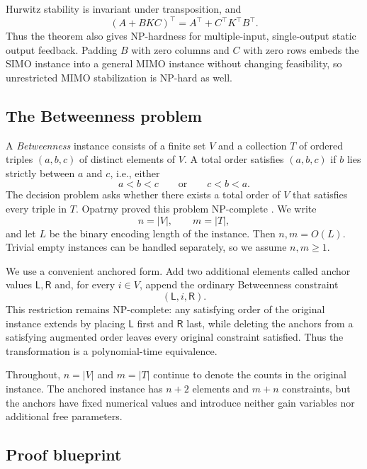 \documentclass[final,5p,times,twocolumn]{elsarticle}
\begin{document}
Hurwitz stability is invariant under transposition, and
\[
(A+BKC)^\top=A^\top+C^\top K^\top B^\top.
\]
Thus the theorem also gives NP-hardness for multiple-input, single-output static output feedback. Padding $B$ with zero columns and $C$ with zero rows embeds the SIMO instance into a general MIMO instance without changing feasibility, so unrestricted MIMO stabilization is NP-hard as well.

\subsection{The Betweenness problem}

A \emph{Betweenness} instance consists of a finite set $V$ and a collection $T$ of ordered triples $(a,b,c)$ of distinct elements of $V$. A total order satisfies $(a,b,c)$ if $b$ lies strictly between $a$ and $c$, i.e., either
\[
a<b<c
\qquad\text{or}\qquad
c<b<a.
\]
The decision problem asks whether there exists a total order of $V$ that satisfies every triple in $T$. Opatrny proved this problem NP-complete \cite{Opatrny1979}. We write
\[
n=|V|,\qquad m=|T|,
\]
and let $L$ be the binary encoding length of the instance. Then $n,m=O(L)$. Trivial empty instances can be handled separately, so we assume $n,m\ge1$.

We use a convenient anchored form. Add two additional elements called anchor values $\mathsf L,\mathsf R$ and, for every $i\in V$, append the ordinary Betweenness constraint
\[
(\mathsf L,i,\mathsf R).
\]
This restriction remains NP-complete: any satisfying order of the original instance extends by placing $\mathsf L$ first and $\mathsf R$ last, while deleting the anchors from a satisfying augmented order leaves every original constraint satisfied. Thus the transformation is a polynomial-time equivalence.

Throughout, $n=|V|$ and $m=|T|$ continue to denote the counts in the original instance. The anchored instance has $n+2$ elements and $m+n$ constraints, but the anchors have fixed numerical values and introduce neither gain variables nor additional free parameters.

\subsection{Proof blueprint}
\end{document}
